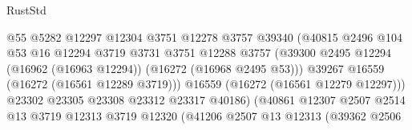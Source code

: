 \begin{lexlean}{RustStd}
\begin{coremodule}
                                            @55
                                            @5282
                                            @12297
                                            @12304
                                            @3751
                                            @12278
                                            @3757
                                            @39340
                                            (@40815
                                              @2496
                                              @104
                                              @53
                                              @16
                                              @12294
                                              @3719
                                              @3731
                                              @3751
                                              @12288
                                              @3757
                                              (@39300
                                                @2495
                                                @12294
                                                (@16962 (@16963 @12294))
                                                (@16272 (@16968 @2495 @53)))
                                              @39267
                                              @16559
                                              (@16272 (@16561 @12289 @3719)))
                                            @16559
                                            (@16272 (@16561 @12279 @12297)))
                                          @23302
                                          @23305
                                          @23308
                                          @23312
                                          @23317
                                          @40186)
                                        (@40861
                                          @12307
                                          @2507
                                          @2514
                                          @13
                                          @3719
                                          @12313
                                          @3719
                                          @12320
                                          (@41206
                                            @2507
                                            @13
                                            @12313
                                            (@39362
                                              @2506

\end{coremodule}
\end{lexlean}
